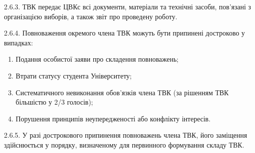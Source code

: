     2.6.3. ТВК передає ЦВКс всі документи, матеріали та технічні засоби, пов'язані з організацією виборів, а також звіт про проведену роботу.

    2.6.4. Повноваження окремого члена ТВК можуть бути припинені достроково у випадках:

        \begin{enumerate}[label=\alph*)]
            \item Подання особистої заяви про складення повноважень;
            \item Втрати статусу студента Університету;
            \item Систематичного невиконання обов'язків члена ТВК (за рішенням ТВК більшістю у 2/3 голосів);
            \item Порушення принципів неупередженості або конфлікту інтересів.
        \end{enumerate}

    2.6.5. У разі дострокового припинення повноважень члена ТВК, його заміщення здійснюється у порядку, визначеному для первинного формування складу ТВК.